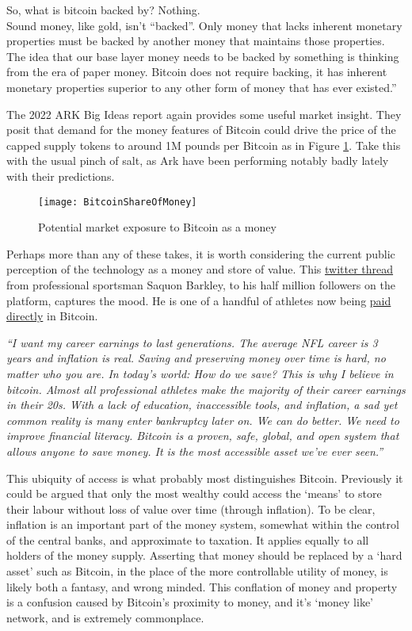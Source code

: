 \begin{itemize}
{So, what is bitcoin backed by? Nothing.\\
Sound money, like gold, isn’t ``backed''.
Only money that lacks inherent monetary properties must be backed by another money that maintains those properties. The idea that our base layer money needs to be backed by something is thinking from the era of paper money. Bitcoin does not require backing, it has inherent monetary properties superior to any other form of money that has ever existed.''}\par
The 2022 ARK Big Ideas report again provides some useful market insight. They posit that demand for the money features of Bitcoin could drive the price of the capped supply tokens to around 1M pounds per Bitcoin as in Figure \ref{fig:BitcoinShareOfMoney}. Take this with the usual pinch of salt, as Ark have been performing notably badly lately with their predictions.
\begin{figure}
  \centering
    \texttt{[image: BitcoinShareOfMoney]}
  \caption{Potential market exposure to Bitcoin as a money}
  \label{fig:BitcoinShareOfMoney}
\end{figure}
Perhaps more than any of these takes, it is worth considering the current public perception of the technology as a money and store of value. This \href{https://twitter.com/saquon/status/1480738426236375041}{twitter thread} from professional sportsman Saquon Barkley, to his half million followers on the platform, captures the mood. He is one of a handful of athletes now being \href{https://www.buybitcoinworldwide.com/athletes/}{paid directly} in Bitcoin.\par
\textit{``I want my career earnings to last generations. The average NFL career is 3 years and inflation is real. Saving and preserving money over time is hard, no matter who you are.
In today’s world: How do we save? This is why I believe in bitcoin. Almost all professional athletes make the majority of their career earnings in their 20s. With a lack of education, inaccessible tools, and inflation, a sad yet common reality is many enter bankruptcy later on. We can do better. We need to improve financial literacy. Bitcoin is a proven, safe, global, and open system that allows anyone to save money. It is the most accessible asset we’ve ever seen.''}\par
This ubiquity of access is what probably most distinguishes Bitcoin. Previously it could be argued that only the most wealthy could access the `means' to store their labour without loss of value over time (through inflation). To be clear, inflation is an important part of the money system, somewhat within the control of the central banks, and approximate to taxation. It applies equally to all holders of the money supply. Asserting that money should be replaced by a `hard asset' such as Bitcoin, in the place of the more controllable utility of money, is likely both a fantasy, and wrong minded. This conflation of money and property is a confusion caused by Bitcoin's proximity to money, and it's `money like' network, and is extremely commonplace.\par

\end{itemize}
